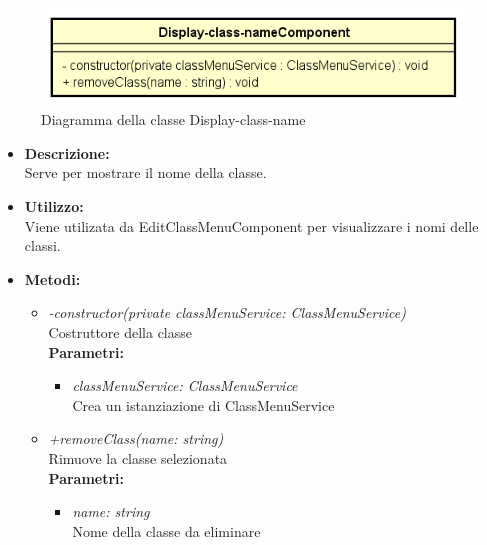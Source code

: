 \begin{figure}[h!]
	\centering
	\includegraphics[scale=0.8]{res/sections/SpecificaFrontEnd/Components/Disegnetti/display-class-name.png}
	\caption{Diagramma della classe Display-class-name}
\end{figure}

\begin{itemize}
	\item \textbf{Descrizione:}\\
	Serve per mostrare il nome della classe.
	\item \textbf{Utilizzo:}\\
	Viene utilizata da EditClassMenuComponent per visualizzare i nomi delle classi.
	\item \textbf{Metodi:}
		\begin{itemize}
			\item \emph{-constructor(private classMenuService: ClassMenuService)}\\
    		Costruttore della classe\\
    		\textbf{Parametri:}
    		\begin{itemize}
    			\item \emph{classMenuService: ClassMenuService}\\
    			Crea un istanziazione di ClassMenuService
    		\end{itemize}
    		\item \emph{+removeClass(name: string)}\\
    		Rimuove la classe selezionata\\
    		\textbf{Parametri:}
    		\begin{itemize}
    			\item \emph{name: string}\\
    			Nome della classe da eliminare
    		\end{itemize}
		\end{itemize}
\end{itemize}